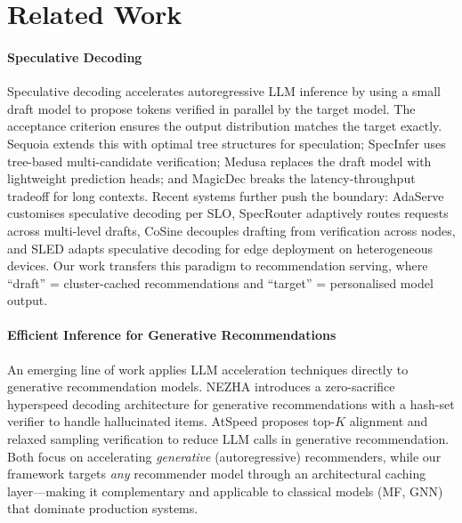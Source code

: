 \documentclass{article}
\begin{document}
\section{Related Work}
\label{sec:related}

\paragraph{Speculative Decoding}
Speculative decoding \citep{leviathan2023, chen2023speculative} accelerates autoregressive LLM inference by using a small draft model to propose tokens verified in parallel by the target model. The acceptance criterion ensures the output distribution matches the target exactly. Sequoia \citep{sequoia2024} extends this with optimal tree structures for speculation; SpecInfer \citep{specinfer2024} uses tree-based multi-candidate verification; Medusa \citep{medusa2024} replaces the draft model with lightweight prediction heads; and MagicDec \citep{magicdec2024} breaks the latency-throughput tradeoff for long contexts. Recent systems further push the boundary: AdaServe \citep{adaserve2025} customises speculative decoding per SLO, SpecRouter \citep{specrouter2025} adaptively routes requests across multi-level drafts, CoSine \citep{cosine_spec2025} decouples drafting from verification across nodes, and SLED \citep{sled2025} adapts speculative decoding for edge deployment on heterogeneous devices. Our work transfers this paradigm to recommendation serving, where ``draft'' = cluster-cached recommendations and ``target'' = personalised model output.

\paragraph{Efficient Inference for Generative Recommendations}
An emerging line of work applies LLM acceleration techniques directly to generative recommendation models. NEZHA \citep{nezha2025} introduces a zero-sacrifice hyperspeed decoding architecture for generative recommendations with a hash-set verifier to handle hallucinated items. AtSpeed \citep{atspeed2024} proposes top-$K$ alignment and relaxed sampling verification to reduce LLM calls in generative recommendation. Both focus on accelerating \emph{generative} (autoregressive) recommenders, while our framework targets \emph{any} recommender model through an architectural caching layer---making it complementary and applicable to classical models (MF, GNN) that dominate production systems.
\end{document}
